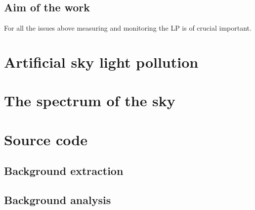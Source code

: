 \documentclass[a4paper, titlepage, 10pt]{book}
\begin{document}
\section{Aim of the work}
For all the issues above measuring and monitoring the LP is of crucial important. 


\chapter{Artificial sky light pollution}
\chapter{The spectrum of the sky}


\appendix
\chapter{Source code}\label{code}
\section{Background extraction}

\section{Background analysis}




\end{document}
